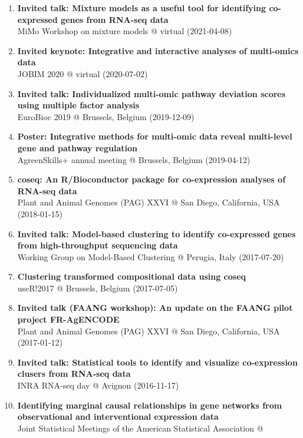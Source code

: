 \documentclass[11pt, a4paper]{awesome-cv}
\providecommand{\tightlist}{%
	\setlength{\itemsep}{0pt}\setlength{\parskip}{0pt}}
\begin{document}
\begin{enumerate}
\def\labelenumi{\arabic{enumi}.}
\tightlist
\item
  \textbf{Invited talk: Mixture models as a useful tool for identifying
  co-expressed genes from RNA-seq data}\\
  MiMo Workshop on mixture models @ virtual (2021-04-08)
\item
  \textbf{Invited keynote: Integrative and interactive analyses of
  multi-omics data}\\
  JOBIM 2020 @ virtual (2020-07-02)
\item
  \textbf{Invited talk: Individualized multi-omic pathway deviation
  scores using multiple factor analysis}\\
  EuroBioc 2019 @ Brussels, Belgium (2019-12-09)
\item
  \textbf{Poster: Integrative methods for multi-omic data reveal
  multi-level gene and pathway regulation}\\
  AgreenSkills+ annual meeting @ Brussels, Belgium (2019-04-12)
\item
  \textbf{coseq: An R/Bioconductor package for co-expression analyses of
  RNA-seq data}\\
  Plant and Animal Genomes (PAG) XXVI @ San Diego, California, USA
  (2018-01-15)
\item
  \textbf{Invited talk: Model-based clustering to identify co-expressed
  genes from high-throughput sequencing data}\\
  Working Group on Model-Based Clustering @ Perugia, Italy (2017-07-20)
\item
  \textbf{Clustering transformed compositional data using coseq}\\
  useR!2017 @ Brussels, Belgium (2017-07-05)
\item
  \textbf{Invited talk (FAANG workshop): An update on the FAANG pilot
  project FR-AgENCODE}\\
  Plant and Animal Genomes (PAG) XXVI @ San Diego, California, USA
  (2017-01-12)
\item
  \textbf{Invited talk: Statistical tools to identify and visualize
  co-expression clusers from RNA-seq data}\\
  INRA RNA-seq day @ Avignon (2016-11-17)
\item
  \textbf{Identifying marginal causal relationships in gene networks
  from observational and interventional expression data}\\
  Joint Statistical Meetings of the American Statistical Association @

\end{enumerate}
\end{document}
